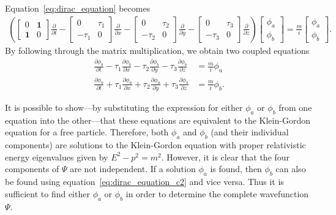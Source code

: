 \documentclass[titlepage,letterpaper,onecolumn,11pt,final]{report}
\numberwithin{equation}{section}
\numberwithin{figure}{section}
\begin{document}
%
Equation~\ref{eq:dirac_equation} becomes
\begin{gather}
	\label{eq:dirac_equation_matrix}
	\left(
	\begin{bmatrix}
		0 & \mathbf{1}   \\
		\mathbf{1} & 0  
	\end{bmatrix}
	\frac{\partial}{\partial t} -
	\begin{bmatrix}
		0 & \tau_{1}  \\
		-\tau_{1} & 0  
	\end{bmatrix}
	\frac{\partial}{\partial x} -
	\begin{bmatrix}
		0 & \tau_{2}  \\
		-\tau_{2} & 0  
	\end{bmatrix}	
	\frac{\partial}{\partial y} -
	\begin{bmatrix}
		0 & \tau_{3}  \\
		-\tau_{3} & 0  
	\end{bmatrix}	
	\frac{\partial}{\partial z} \right)
	\begin{bmatrix}
		\phi_{a}\\
		\phi_{b}
	\end{bmatrix}
	= \frac{m}{i} 
	\begin{bmatrix}
		\phi_{a}\\
		\phi_{b}
	\end{bmatrix}	.
\end{gather}
%
By following through the matrix multiplication, we obtain two coupled equations
\begin{subequations}
\begin{align}
	\label{eq:dirac_equation_c1}
	\frac{\partial \phi_{b}}{\partial t} - \tau_{1} \frac{\partial \phi_{b}}{\partial x} - \tau_{2} \frac{\partial \phi_{b}}{\partial y} - \tau_{3} \frac{\partial \phi_{b}}{\partial z} &= \frac{m}{i} \phi_{a} \\
	\label{eq:dirac_equation_c2}
	\frac{\partial \phi_{a}}{\partial t} + \tau_{1} \frac{\partial \phi_{a}}{\partial x} + \tau_{2} \frac{\partial \phi_{a}}{\partial y} + \tau_{3} \frac{\partial \phi_{a}}{\partial z} &= \frac{m}{i} \phi_{b} .
\end{align}
\end{subequations}

It is possible to show---by substituting the expression for either $\phi_{a}$ or $\phi_{b}$ from one equation into the other---that these equations are equivalent to the Klein-Gordon equation for a free particle. Therefore, both $\phi_{a}$ and $\phi_{b}$ (and their individual components) are solutions to the Klein-Gordon equation with proper relativistic energy eigenvalues given by $E^{2} - p^{2} = m^{2}$. However, it is clear that the four components of $\Psi$ are not independent. If a solution $\phi_{a}$ is found, then $\phi_{b}$ can also be found using equation~\ref{eq:dirac_equation_c2} and vice versa. Thus it is sufficient to find either $\phi_{a}$ or $\phi_{b}$ in order to determine the complete wavefunction $\Psi$.
\end{document}
